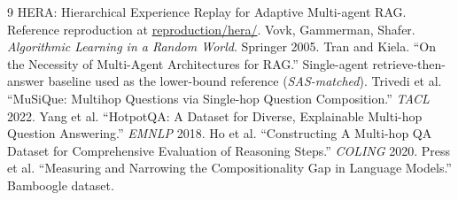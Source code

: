\documentclass[11pt]{article}
\begin{document}
\begin{thebibliography}{9}
HERA: Hierarchical Experience Replay for Adaptive Multi-agent RAG.
Reference reproduction at \url{reproduction/hera/}.
Vovk, Gammerman, Shafer. \emph{Algorithmic Learning in a Random World}.
Springer 2005.
Tran and Kiela. ``On the Necessity of Multi-Agent Architectures for RAG.''
Single-agent retrieve-then-answer baseline used as the lower-bound
reference (\textit{SAS-matched}).
Trivedi et al. ``MuSiQue: Multihop Questions via Single-hop Question
Composition.'' \emph{TACL} 2022.
Yang et al. ``HotpotQA: A Dataset for Diverse, Explainable Multi-hop
Question Answering.'' \emph{EMNLP} 2018.
Ho et al. ``Constructing A Multi-hop QA Dataset for Comprehensive
Evaluation of Reasoning Steps.'' \emph{COLING} 2020.
Press et al. ``Measuring and Narrowing the Compositionality Gap in
Language Models.'' Bamboogle dataset.
\end{thebibliography}
\end{document}
